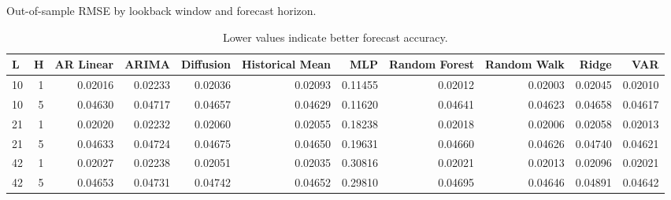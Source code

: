 \begin{table}[!htbp]
\centering
\caption{Out-of-sample RMSE by lookback window and forecast horizon.}
\label{tab:rmse-by-config}
\begin{tabular}{lrrrrrrrrrr}
\toprule
L & H & AR Linear & ARIMA & Diffusion & Historical Mean & MLP & Random Forest & Random Walk & Ridge & VAR \\
\midrule
10 & 1 & 0.02016 & 0.02233 & 0.02036 & 0.02093 & 0.11455 & 0.02012 & 0.02003 & 0.02045 & 0.02010 \\
10 & 5 & 0.04630 & 0.04717 & 0.04657 & 0.04629 & 0.11620 & 0.04641 & 0.04623 & 0.04658 & 0.04617 \\
21 & 1 & 0.02020 & 0.02232 & 0.02060 & 0.02055 & 0.18238 & 0.02018 & 0.02006 & 0.02058 & 0.02013 \\
21 & 5 & 0.04633 & 0.04724 & 0.04675 & 0.04650 & 0.19631 & 0.04660 & 0.04626 & 0.04740 & 0.04621 \\
42 & 1 & 0.02027 & 0.02238 & 0.02051 & 0.02035 & 0.30816 & 0.02021 & 0.02013 & 0.02096 & 0.02021 \\
42 & 5 & 0.04653 & 0.04731 & 0.04742 & 0.04652 & 0.29810 & 0.04695 & 0.04646 & 0.04891 & 0.04642 \\
\bottomrule
\end{tabular}
\caption*{\footnotesize Lower values indicate better forecast accuracy.}
\end{table}
